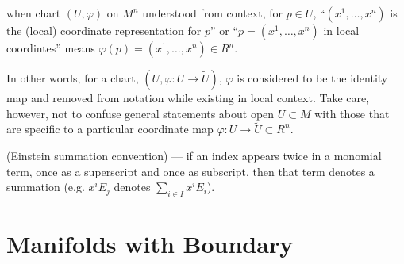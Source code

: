 \begin{defn}
  when chart $(U,\varphi)$ on $M^n$ understood from context,
  for $p\in U$, ``$(x^1,\ldots,x^n)$ is the (local) coordinate
  representation for $p$'' or ``$p=(x^1,\ldots,x^n)$ in
  local coordintes'' means
  $\varphi(p)=(x^1,\ldots,x^n)\in R^n$.
\end{defn}

In other words, for a chart,
$(U,\varphi: U\rightarrow\widetilde{U})$,
$\varphi$ is considered to be the identity map and removed from
notation while existing in local context.
Take care, however, not to confuse general statements about
open $U\subset M$ with those that are specific to a particular
coordinate map $\varphi:U\rightarrow\widetilde{U}\subset R^n$.


\begin{nota}
  (Einstein summation convention) ---
  if an index appears twice in a monomial term,
  once as a superscript and once as subscript,
  then that term denotes a summation
  (e.g. $x^iE_j$ denotes $\sum_{i\in I} x^i E_i$).
\end{nota}

\section{Manifolds with Boundary}

